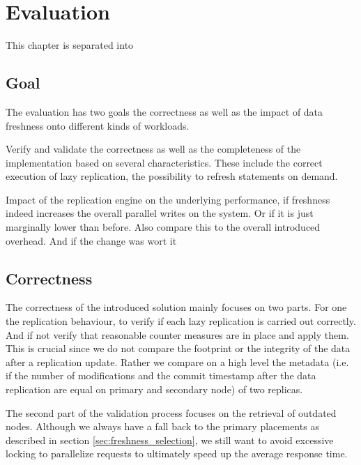 \chapter{Evaluation}
\label{c:evaluation}

This chapter is separated into 

\section{Goal}
The evaluation has two goals the correctness as well as the impact of data freshness onto different kinds of workloads.

Verify and validate the correctness as well as the completeness of the implementation based on several characteristics.
These include the correct execution of lazy replication, the possibility to refresh statements on demand.

Impact of the replication engine on the underlying performance, if freshness indeed increases the overall parallel writes on the system.
Or if it is just marginally lower than before. Also compare this to the overall introduced overhead. And if the change was wort it



\section{Correctness}

The correctness of the introduced solution mainly focuses on two parts. For one the replication behaviour, to verify if each lazy replication is carried out correctly.
And if not verify that reasonable counter measures are in place and apply them. This is crucial since we do not compare the footprint or the integrity of the data after 
a replication update. Rather we compare on a high level the metadata 
(i.e. if the number of modifications and the commit timestamp after the data replication are equal on primary and secondary node) of two replicas. 

The second part of the validation process focuses on the retrieval of outdated nodes. Although we always have a fall back to the primary placements as described in section \ref{sec:freshness_selection},
we still want to avoid excessive locking to parallelize requests to ultimately speed up the average response time.


\todoMissing{\ref{sec:constraints, lazy -> eager and outdated -> refreshable}}

